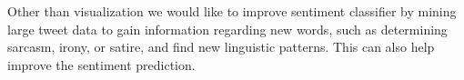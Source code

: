 Other than visualization we would like to improve sentiment classifier by mining large tweet data to gain information regarding new words, such as determining sarcasm, irony, or satire, and find new linguistic patterns. This can also help improve the sentiment prediction.


%
%
%
%
%
%
%
%



